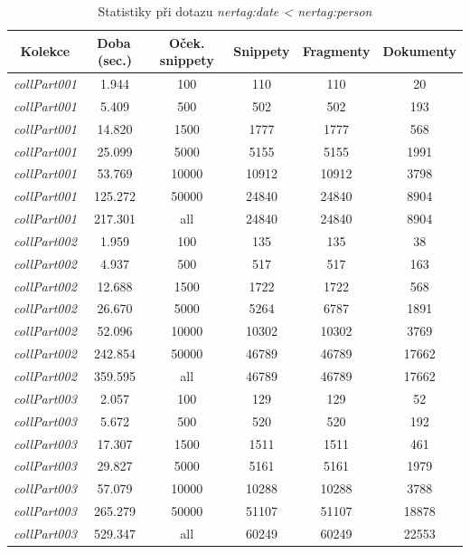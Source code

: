 \clearpage

\begin{table}[!ht]
\begin{tabular}{|c|c|c|c|c|c|}
\hline
\textbf{Kolekce} & \textbf{Doba\,(sec.)} & \textbf{Oček. snippety} & \textbf{Snippety} & \textbf{Fragmenty} & \textbf{Dokumenty} \\
\hline
\emph{collPart001} & 1.944 & 100 & 110 & 110 & 20 \\
\hline
\emph{collPart001} & 5.409 & 500 & 502 & 502 & 193\\
\hline
\emph{collPart001} & 14.820 & 1500 & 1777 & 1777 & 568 \\
\hline
\emph{collPart001} & 25.099 & 5000 & 5155 & 5155 & 1991 \\
\hline
\emph{collPart001} & 53.769 & 10000 & 10912 & 10912 & 3798 \\
\hline
\emph{collPart001} &  125.272 & 50000 & 24840 & 24840 & 8904 \\
\hline
\emph{collPart001} &  217.301 & all & 24840 & 24840 & 8904 \\
\hline\hline
\emph{collPart002} & 1.959 & 100 & 135 & 135 & 38 \\
\hline
\emph{collPart002} & 4.937 & 500 & 517 & 517 & 163 \\
\hline
\emph{collPart002} & 12.688 & 1500 & 1722 & 1722 & 568 \\
\hline
\emph{collPart002} & 26.670 & 5000 & 5264 & 6787 & 1891 \\
\hline
\emph{collPart002} & 52.096 & 10000 & 10302 & 10302 & 3769 \\
\hline
\emph{collPart002} & 242.854 & 50000 & 46789 & 46789 & 17662 \\
\hline
\emph{collPart002} & 359.595 & all & 46789 & 46789 & 17662\\
\hline\hline
\emph{collPart003} & 2.057 & 100 & 129 & 129 & 52 \\
\hline
\emph{collPart003} & 5.672 & 500 & 520 & 520 & 192 \\
\hline
\emph{collPart003} & 17.307 & 1500 & 1511 & 1511 & 461 \\
\hline
\emph{collPart003} & 29.827 & 5000 & 5161 & 5161 & 1979 \\
\hline
\emph{collPart003} & 57.079 & 10000 & 10288 & 10288 & 3788\\
\hline
\emph{collPart003} & 265.279 & 50000 & 51107 & 51107 & 18878\\
\hline
\emph{collPart003} & 529.347 & all & 60249 & 60249 & 22553\\
\hline
\end{tabular}

\caption{Statistiky při dotazu \emph{nertag:date < nertag:person}}
\label{nertagdatenertagpersonStats}
\end{table}





